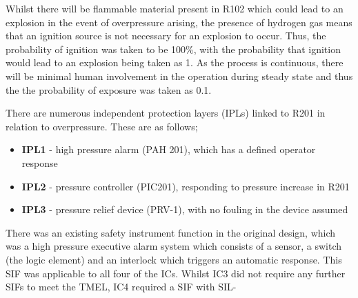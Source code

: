 Whilst there will be flammable material present in R102 which could lead to an explosion in the event of overpressure arising, the presence of hydrogen gas means that an ignition source is not necessary for an explosion to occur. Thus, the probability of ignition was taken to be 100\%, with the probability that ignition would lead to an explosion being taken as 1. As the process is continuous, there will be minimal human involvement in the operation during steady state and thus the the probability of exposure was taken as 0.1. 

There are numerous  independent protection layers (IPLs) linked to R201 in relation to overpressure. These are as follows;
 
 \begin{itemize}
\item \textbf{IPL1} - high pressure alarm (PAH 201), which has a defined operator response
\item  \textbf{IPL2} - pressure controller (PIC201), responding to pressure increase in R201
\item  \textbf{IPL3} - pressure relief device (PRV-1), with no fouling in the device assumed
 \end{itemize}


There was an existing safety instrument function in the original design, which was a high pressure executive alarm system which consists of a sensor, a switch (the logic element) and an interlock which triggers an automatic response. This SIF was applicable to all four of the ICs. Whilst IC3 did not require any further SIFs to meet the TMEL, IC4 required a SIF with SIL-










 
